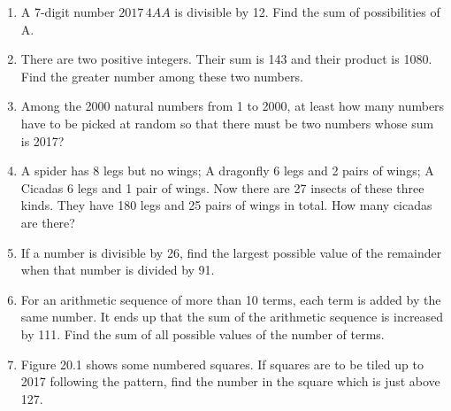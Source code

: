 \documentclass[11pt]{scrartcl}
\begin{document}
\begin{enumerate}
    \item A 7-digit number $2017\,4AA$ is divisible by 12. Find the sum of possibilities of A.
    \item There are two positive integers. Their sum is 143 and their product is 1080. Find the greater number among these two numbers.
    \item Among the 2000 natural numbers from 1 to 2000, at least how many numbers have to be picked at random so that there must be two numbers whose sum is 2017?
    \item A spider has 8 legs but no wings; A dragonfly 6 legs and 2 pairs of wings; A Cicadas 6 legs and 1 pair of wings. Now there are 27 insects of these three kinds. They have 180 legs and 25 pairs of wings in total. How many cicadas are there?
    \item If a number is divisible by 26, find the largest possible value of the remainder when that number is divided by 91.
    \item For an arithmetic sequence of more than 10 terms, each term is added by the same number. It ends up that the sum of the arithmetic sequence is increased by 111. Find the sum of all possible values of the number of terms.
    \item Figure 20.1 shows some numbered squares. If squares are to be tiled up to 2017 following the pattern, find the number in the square which is just above 127.
\end{enumerate}
\end{document}
